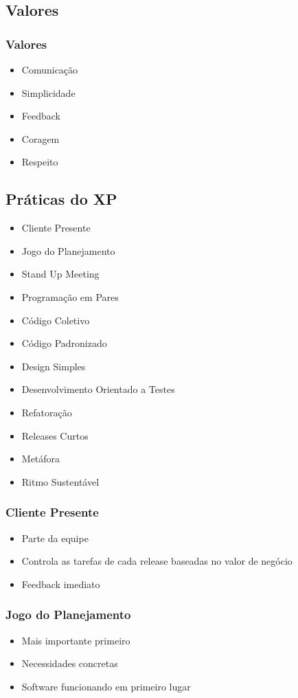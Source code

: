 \documentclass[10pt]{beamer}
\begin{document}
\subsection{Valores}
\begin{frame}
  \frametitle{Valores}
  \begin{itemize}
  \item Comunicação
  \item Simplicidade
  \item Feedback
  \item Coragem
  \item Respeito
  \end{itemize}
\end{frame}

\subsection{Práticas do XP}
\begin{frame}
  \begin{itemize}
  \item Cliente Presente
  \item Jogo do Planejamento
  \item Stand Up Meeting
  \item Programação em Pares
  \item Código Coletivo
  \item Código Padronizado
  \item Design Simples
  \item Desenvolvimento Orientado a Testes
  \item Refatoração
  \item Releases Curtos
  \item Metáfora
  \item Ritmo Sustentável
  \end{itemize}
\end{frame}

\begin{frame}
  \frametitle{Cliente Presente}
  \begin{itemize}
  \item Parte da equipe
  \item Controla as tarefas de cada release baseadas no valor de negócio
  \item Feedback imediato
  \end{itemize}
\end{frame}

\begin{frame}
  \frametitle{Jogo do Planejamento}
  \begin{itemize}
  \item Mais importante primeiro
  \item Necessidades concretas
  \item Software funcionando em primeiro lugar
  \end{itemize}
\end{frame}
\end{document}
